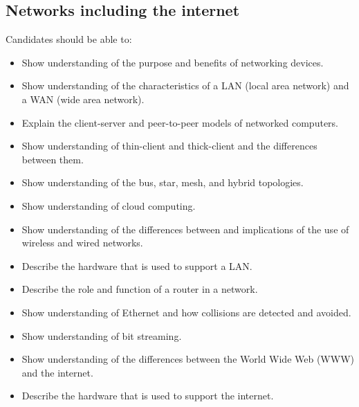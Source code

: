 \documentclass[a4paper]{article}
\begin{document}
\subsection{Networks including the internet}
Candidates should be able to:
\begin{itemize}
  \item Show understanding of the purpose and benefits of networking devices.
  \item Show understanding of the characteristics of a LAN (local area network) and a WAN (wide area network).
  \item Explain the client-server and peer-to-peer models of networked computers.
  \item Show understanding of thin-client and thick-client and the differences between them.
  \item Show understanding of the bus, star, mesh, and hybrid topologies.
  \item Show understanding of cloud computing.
  \item Show understanding of the differences between and implications of the use of wireless and wired networks.
  \item Describe the hardware that is used to support a LAN.
  \item Describe the role and function of a router in a network.
  \item Show understanding of Ethernet and how collisions are detected and avoided.
  \item Show understanding of bit streaming.
  \item Show understanding of the differences between the World Wide Web (WWW) and the internet.
  \item Describe the hardware that is used to support the internet.
\end{itemize}
\end{document}
